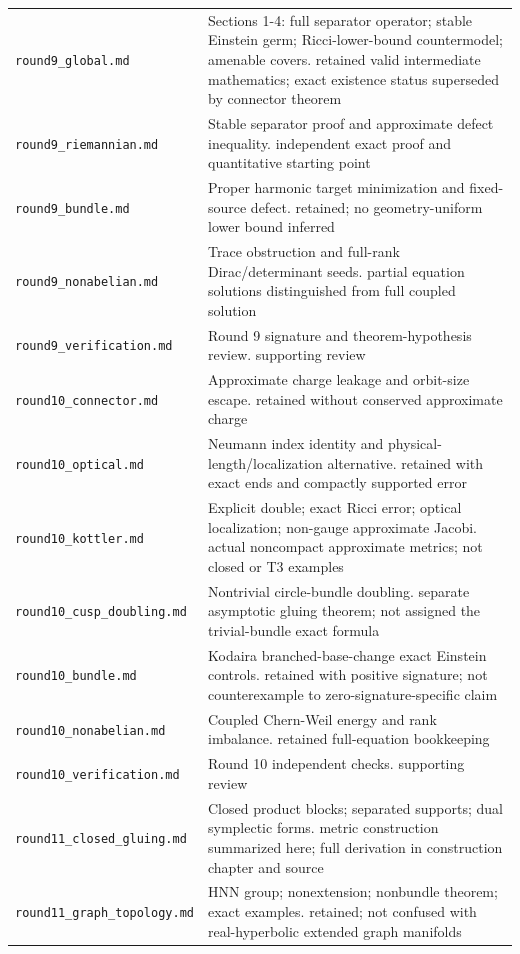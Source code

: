\documentclass[UTF8,fontset=fandol,zihao=-4]{ctexart}
\theoremstyle{cn}
\begin{document}
\begin{longtable}{L{.34\textwidth}L{.59\textwidth}}
\nolinkurl{round9_global.md} & Sections 1-4: full separator operator; stable Einstein germ; Ricci-lower-bound countermodel; amenable covers. retained valid intermediate mathematics; exact existence status superseded by connector theorem\\
\nolinkurl{round9_riemannian.md} & Stable separator proof and approximate defect inequality. independent exact proof and quantitative starting point\\
\nolinkurl{round9_bundle.md} & Proper harmonic target minimization and fixed-source defect. retained; no geometry-uniform lower bound inferred\\
\nolinkurl{round9_nonabelian.md} & Trace obstruction and full-rank Dirac/determinant seeds. partial equation solutions distinguished from full coupled solution\\
\nolinkurl{round9_verification.md} & Round 9 signature and theorem-hypothesis review. supporting review\\
\nolinkurl{round10_connector.md} & Approximate charge leakage and orbit-size escape. retained without conserved approximate charge\\
\nolinkurl{round10_optical.md} & Neumann index identity and physical-length/localization alternative. retained with exact ends and compactly supported error\\
\nolinkurl{round10_kottler.md} & Explicit double; exact Ricci error; optical localization; non-gauge approximate Jacobi. actual noncompact approximate metrics; not closed or T3 examples\\
\nolinkurl{round10_cusp_doubling.md} & Nontrivial circle-bundle doubling. separate asymptotic gluing theorem; not assigned the trivial-bundle exact formula\\
\nolinkurl{round10_bundle.md} & Kodaira branched-base-change exact Einstein controls. retained with positive signature; not counterexample to zero-signature-specific claim\\
\nolinkurl{round10_nonabelian.md} & Coupled Chern-Weil energy and rank imbalance. retained full-equation bookkeeping\\
\nolinkurl{round10_verification.md} & Round 10 independent checks. supporting review\\
\nolinkurl{round11_closed_gluing.md} & Closed product blocks; separated supports; dual symplectic forms. metric construction summarized here; full derivation in construction chapter and source\\
\nolinkurl{round11_graph_topology.md} & HNN group; nonextension; nonbundle theorem; exact examples. retained; not confused with real-hyperbolic extended graph manifolds\\

\end{longtable}
\end{document}
